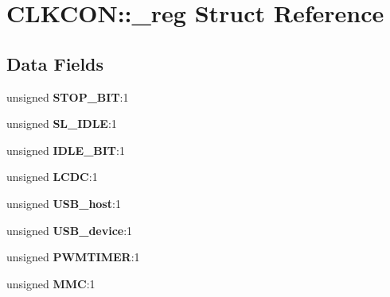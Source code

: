 \hypertarget{structCLKCON_1_1__reg}{}\section{C\+L\+K\+C\+ON\+::\+\_\+reg Struct Reference}
\label{structCLKCON_1_1__reg}
\subsection*{Data Fields}
\begin{DoxyCompactItemize}
\item 
\mbox{\label{structCLKCON_1_1__reg_a901dac4c3139de2c689bb82a2e324e30}} 
unsigned {\bfseries S\+T\+O\+P\+\_\+\+B\+IT}\+:1
\item 
\mbox{\label{structCLKCON_1_1__reg_a551a402db49361d7d5689559a04a0b44}} 
unsigned {\bfseries S\+L\+\_\+\+I\+D\+LE}\+:1
\item 
\mbox{\label{structCLKCON_1_1__reg_aabd2f952aa29561e3f1163cd8b0ea068}} 
unsigned {\bfseries I\+D\+L\+E\+\_\+\+B\+IT}\+:1
\item 
\mbox{\label{structCLKCON_1_1__reg_af65ca5ddb43b366a1a06a74015566cb4}} 
unsigned {\bfseries L\+C\+DC}\+:1
\item 
\mbox{\label{structCLKCON_1_1__reg_a49d8f1f7221cda9e3ed1d2de44c8fd7f}} 
unsigned {\bfseries U\+S\+B\+\_\+host}\+:1
\item 
\mbox{\label{structCLKCON_1_1__reg_a373c707501a04af6e027aa35c33bbc3e}} 
unsigned {\bfseries U\+S\+B\+\_\+device}\+:1
\item 
\mbox{\label{structCLKCON_1_1__reg_ad37b023fcb8cd27cb6e40499b2778a58}} 
unsigned {\bfseries P\+W\+M\+T\+I\+M\+ER}\+:1
\item 
\mbox{\label{structCLKCON_1_1__reg_a2b18ceec53e6cafb36317b7f0ccbf7a4}} 
unsigned {\bfseries M\+MC}\+:1
\item 
\mbox{\label{structCLKCON_1_1__reg_acf4b1c65bc709f723590d4f6c9a33593}} 

\end{DoxyCompactItemize}
